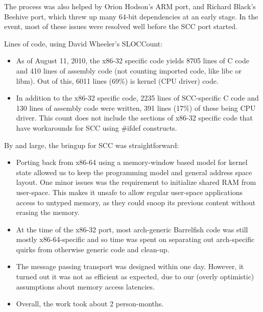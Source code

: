 \documentclass[a4paper,twoside]{report} %
\begin{document}
The process was also helped by Orion Hodson's ARM port, and Richard
Black's Beehive port, which threw up many 64-bit dependencies at an
early stage.  In the event, most of these issues were resolved well
before the SCC port started. 

Lines of code, using David Wheeler's SLOCCount:

\begin{itemize}

\item As of August 11, 2010, the x86-32 specific code yields 8705
  lines of C code and 410 lines of assembly code (not counting
  imported code, like libc or libm). Out of this, 6011 lines (69\%) is
  kernel (CPU driver) code.

\item In addition to the x86-32 specific code, 2235 lines of
  SCC-specific C code and 130 lines of assembly code were written, 391 
  lines (17\%) of these being CPU driver. This count does not include
  the sections of x86-32 specific code that have workarounds for SCC
  using \#ifdef constructs.
\end{itemize}

By and large, the bringup for SCC was straightforward:


\begin{itemize}
\item Porting back from x86-64 using a memory-window
  based model for kernel state allowed us to keep the programming
  model and general address space layout.  One minor issues was the
  requirement to initialize shared RAM from
  user-space.  This makes it unsafe to allow regular user-space
  applications access to untyped memory, as they could snoop its
  previous content without erasing the memory.

\item At the time of the x86-32 port, most arch-generic Barrelfish
  code was still mostly x86-64-specific and so time was spent on
  separating out arch-specific quirks from otherwise generic code and
  clean-up. 

\item The message passing transport was designed within one
  day. However, it turned out it was not as efficient as expected, due
  to our (overly optimistic) assumptions about memory access latencies.

\item Overall, the work took about 2 person-months.
\end{itemize}
\end{document}
